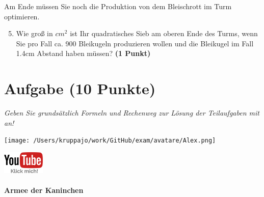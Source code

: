 \documentclass[a4paper, 9pt]{scrartcl}\usepackage[]{graphicx}\usepackage[]{xcolor}
\begin{document}
Am Ende müssen Sie noch die Produktion von dem Bleischrott im Turm optimieren.

\begin{enumerate}
  \setcounter{enumi}{4}
\item Wie gro{\ss} in $cm^2$ ist Ihr quadratisches Sieb am oberen Ende des Turms,
  wenn Sie pro Fall ca. 900 Bleikugeln produzieren wollen und
  die Bleikugel im Fall 1.4cm Abstand haben müssen?  \textbf{(1
    Punkt)}
\end{enumerate}
 
\clearpage

\section{Aufgabe \hfill (10 Punkte)}

\textit{Geben Sie grundsätzlich Formeln und Rechenweg zur Lösung der Teilaufgaben mit an!} \\[1Ex]
 

 
\ifcollection
\begin{flushright}
\tiny\vspace{-3Ex}
\textbf{\examinhaltstart}
\exammodulemathstat
\vspace{-4Ex}
\end{flushright}
\begin{minipage}[t]{0.5\textwidth}
\texttt{[image: /Users/kruppajo/work/GitHub/exam/avatare/Alex.png]}
\end{minipage}
\begin{minipage}[t]{0.5\textwidth}
\hfill
\href{https://youtu.be/Mr6eslls4J0}{\includegraphics[width = 2cm]{img/youtube}}
\end{minipage}
\fi



\ifcollection
\paragraph{Armee der Kaninchen}
\fi
\end{document}
